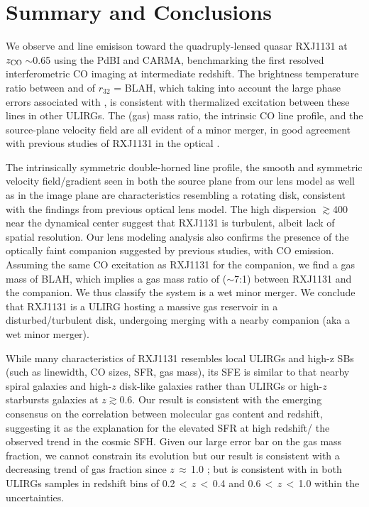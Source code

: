 \documentclass[]{emulateapj}
\begin{document}
\section{Summary and Conclusions} \label{sec:sum}

We observe \bco and \cco line emisison toward the
quadruply-lensed quasar RXJ1131 at $z_{\rm CO}$\,$\sim$0.65 
using the PdBI and CARMA, benchmarking the 
first resolved interferometric CO imaging at intermediate redshift.
The brightness temperature ratio between \bco and \cco of $r_{32}$ = BLAH, which taking into 
account the large phase errors associated with \cco, is consistent with
thermalized excitation between these lines in other ULIRGs.
The (gas) mass ratio, the intrinsic CO line profile,
and the source-plane velocity field are all evident of
a minor merger, in good agreement with previous studies of RXJ1131 in the optical . 

The intrinsically symmetric double-horned line profile, the smooth and
symmetric velocity field/gradient seen in both the source plane from our lens model as well
as in the image plane are characteristics resembling a rotating disk, 
consistent with the findings from previous optical lens model.
The high dispersion $\gtrsim$400\,\kms near the dynamical center suggest that 
RXJ1131 is turbulent, albeit lack of spatial resolution. 
Our lens modeling analysis also confirms the presence of the optically faint companion 
suggested by previous studies, with CO emission.
Assuming the same CO excitation as RXJ1131 for the companion, we find a gas mass of BLAH,
which implies a gas mass ratio of ($\sim$7:1) between RXJ1131 and the companion. 
We thus classify the system is a wet minor merger.
We conclude that RXJ1131 is a ULIRG hosting a massive gas reservoir in a disturbed/turbulent
disk, undergoing merging with a nearby companion (aka a wet minor merger).

While many characteristics of RXJ1131 resembles local ULIRGs and high-z SBs (such as 
linewidth, CO sizes, SFR, gas mass), its SFE is similar to that nearby 
spiral galaxies and high-$z$ disk-like galaxies rather than 
ULIRGs or high-$z$ starbursts galaxies at $z$$\gtrsim$0.6. 
Our result is consistent with the emerging consensus on
the correlation between molecular gas content and redshift,
suggesting it as the explanation for the elevated SFR at high redshift/
the observed trend in the cosmic SFH.
Given our large error bar on the gas mass fraction, we cannot constrain its evolution 
but our result is consistent with a decreasing trend of gas fraction
since $z$\,$\approx$\,1.0 \citep{Combes13a}; but is consistent with 
in both ULIRGs samples in redshift bins of 0.2\,$<$\,$z$\,$<$\,0.4 and 0.6\,$<$\,$z$\,$<$\,1.0 within the uncertainties.
\end{document}
